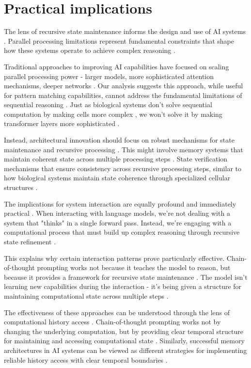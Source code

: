 \documentclass[12pt]{article}
\begin{document}
\section{Practical implications}

The lens of recursive state maintenance informs the design and use of AI systems \cite{dickson2024trust,ahn2024recursive}. Parallel processing limitations represent fundamental constraints that shape how these systems operate to achieve complex reasoning \cite{merrill2023parallelism}.

Traditional approaches to improving AI capabilities have focused on scaling parallel processing power - larger models, more sophisticated attention mechanisms, deeper networks \cite{shallue2019measuring}. Our analysis suggests this approach, while useful for pattern matching capabilities, cannot address the fundamental limitations of sequential reasoning \cite{peng2024limitations}. Just as biological systems don't solve sequential computation by making cells more complex \cite{wang2023parallel}, we won't solve it by making transformer layers more sophisticated \cite{zhao2024epha}.

Instead, architectural innovation should focus on robust mechanisms for state maintenance and recursive processing \cite{jung2020new}. This might involve memory systems that maintain coherent state across multiple processing steps \cite{zhu2024overcoming}. State verification mechanisms that ensure consistency across recursive processing steps, similar to how biological systems maintain state coherence through specialized cellular structures \cite{espinosa2024molecular}.

The implications for system interaction are equally profound and immediately practical \cite{wei2022chain}. When interacting with language models, we're not dealing with a system that "thinks" in a single forward pass. Instead, we're engaging with a computational process that must build up complex reasoning through recursive state refinement \cite{dickson2024trust}.

This explains why certain interaction patterns prove particularly effective. Chain-of-thought prompting works not because it teaches the model to reason, but because it provides a framework for recursive state maintenance \cite{wei2022chain}. The model isn't learning new capabilities during the interaction - it's being given a structure for maintaining computational state across multiple steps \cite{ahn2024recursive}.

The effectiveness of these approaches can be understood through the lens of computational history access \cite{fu2024memory}. Chain-of-thought prompting works not by changing the underlying computation, but by providing clear temporal structure for maintaining and accessing computational state \cite{wei2022chain}. Similarly, successful memory architectures in AI systems can be viewed as different strategies for implementing reliable history access with clear temporal boundaries \cite{yang2013survey}.
\end{document}
